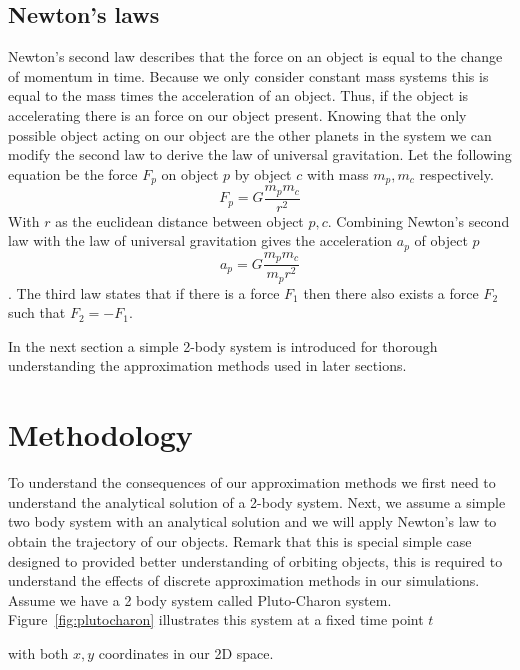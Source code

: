 \documentclass[11pt]{article} %
\begin{document}
\subsection{Newton's laws}
Newton's second law describes that the force on an object is equal to the change of momentum in time. Because we only consider constant mass systems this is equal to the mass times the acceleration of an object. Thus, if the object is accelerating there is an force on our object present. Knowing that the only possible object acting on our object are the other planets in the system we can modify the second law to derive the law of universal gravitation. Let the following equation be the force $F_p$ on object $p$ by object $c$ with mass $m_p,m_c$ respectively.   
\begin{equation}
    \label{eq:newtongravity}
 F_p = G\frac{m_pm_c}{r^2}
\end{equation}
With $r$ as the euclidean distance between object $p,c$. Combining Newton's second law with the law of universal gravitation gives the acceleration $a_p$ of object $p$
\begin{equation}
    \label{eq:newtongravity}
	a_p = G\frac{m_pm_c}{ m_pr^2}
\end{equation}.
The third law states that if there is a force $F_1$ then there also exists a force $F_2$ such that $F_2 = - F_1$. 

In the next section a simple 2-body system is introduced for thorough understanding the approximation methods used in later sections.


\section{Methodology}
\label{sec:methodology}
To understand the consequences of our approximation methods we first need to understand the analytical solution of a 2-body system. Next, we assume a simple two body system with an analytical solution and we will apply Newton's law to obtain the trajectory of our objects. Remark that this is special simple case designed to provided better understanding of orbiting objects, this is required to understand the effects of discrete approximation methods in our simulations. \\
\indent Assume we have a 2 body system called Pluto-Charon system. Figure~\ref{fig:plutocharon} illustrates this system at a fixed time point $t$
\begin{figure*}
	\label{fig:plutocharon}
\end{figure*}
with both $x,y$ coordinates in our 2D space.
\end{document}
